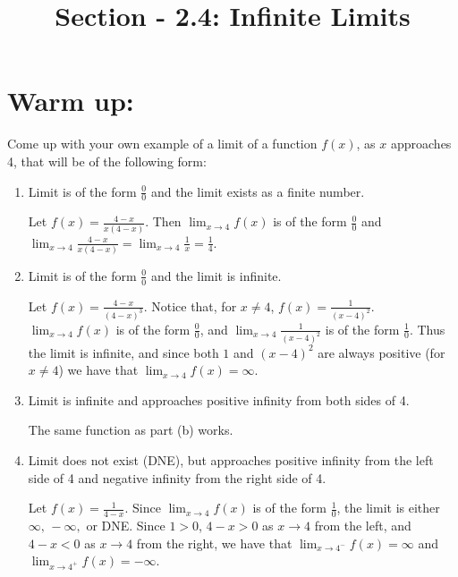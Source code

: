 \documentclass[handout,nooutcomes]{ximera}
\title{Section - 2.4:  Infinite Limits}
\begin{document}
\begin{abstract}		\end{abstract}
\maketitle

\section*{Warm up:}  
Come up with your own example of a limit of a function $f(x)$, as $x$ approaches 4, that will be of the following form:

	\begin{enumerate}[label=(\alph*)]
	
	\item  Limit is of the form $\frac{0}{0}$ and the limit exists as a finite number.
		\begin{freeResponse}
		Let $f(x) = \frac{4-x}{x(4-x)}$.  Then $\lim_{x \to 4} f(x)$ is of the form $\frac{0}{0}$ and $\lim_{x \to 4} \frac{4-x}{x(4-x)} = \lim_{x \to 4} \frac{1}{x} = \frac{1}{4} $.  
		\end{freeResponse}
	
	
	
	\item  Limit is of the form $\frac{0}{0}$ and the limit is infinite.
		\begin{freeResponse}
		Let $f(x) = \frac{4-x}{(4-x)^3}$.  Notice that, for $x \neq 4$, $f(x) = \frac{1}{(x-4)^2}$.  $\lim_{x \to 4} f(x)$ is of the form $\frac{0}{0}$, and $\lim_{x \to 4} \frac{1}{(x-4)^2} $ is of the form $\frac{1}{0}$.  Thus the limit is infinite, and since both $1$ and $(x-4)^2$ are always positive (for $x \neq 4$) we have that $\lim_{x \to 4} f(x) = \infty $.  		
		\end{freeResponse}
	
	\item  Limit is infinite and approaches positive infinity from both sides of 4.
		\begin{freeResponse}
		 The same function as part (b) works. 
		 \end{freeResponse}
	
	
	
	\item  Limit does not exist (DNE), but approaches positive infinity from the left side of 4 and negative infinity from the right side of 4.
		\begin{freeResponse}  Let $f(x) = \frac{1}{4-x}$.  Since $\lim_{x \to 4} f(x)$ is of the form $\frac{1}{0}$, the limit is either $\infty, \, -\infty, $ or DNE.  Since $1 > 0$, $4-x > 0$ as $x \to 4$ from the left, and $4-x < 0$ as $x \to 4$ from the right, we have that $ \lim_{x \to 4^-} f(x) = \infty  $ and $ \lim_{x \to 4^+} f(x) = - \infty  $.
		\end{freeResponse}
	
	\end{enumerate}
\end{document}

